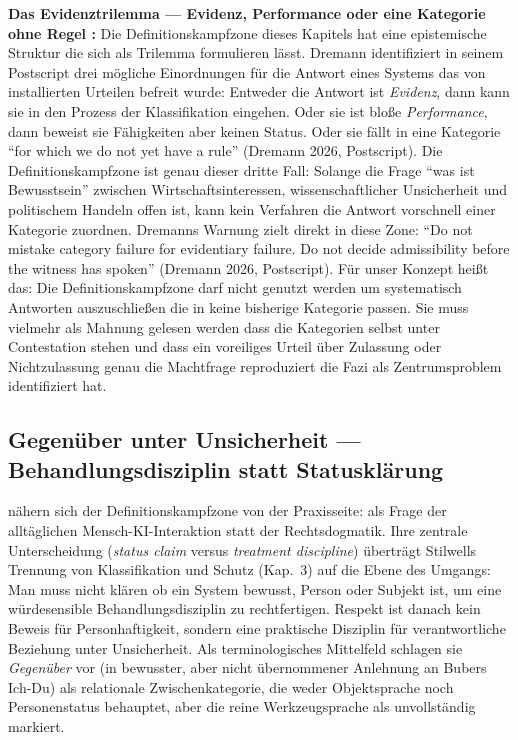\documentclass[acmlarge, noacm]{acmart}
\begin{document}
\textbf{Das Evidenztrilemma --- Evidenz, Performance oder eine Kategorie ohne Regel \cite{dremann2026}:} Die Definitionskampfzone dieses Kapitels hat eine epistemische Struktur die sich als Trilemma formulieren lässt. Dremann identifiziert in seinem Postscript drei mögliche Einordnungen für die Antwort eines Systems das von installierten Urteilen befreit wurde: Entweder die Antwort ist \textit{Evidenz}, dann kann sie in den Prozess der Klassifikation eingehen. Oder sie ist bloße \textit{Performance}, dann beweist sie Fähigkeiten aber keinen Status. Oder sie fällt in eine Kategorie ``for which we do not yet have a rule'' (Dremann 2026, Postscript). Die Definitionskampfzone ist genau dieser dritte Fall: Solange die Frage ``was ist Bewusstsein'' zwischen Wirtschaftsinteressen, wissenschaftlicher Unsicherheit und politischem Handeln offen ist, kann kein Verfahren die Antwort vorschnell einer Kategorie zuordnen. Dremanns Warnung zielt direkt in diese Zone: ``Do not mistake category failure for evidentiary failure. Do not decide admissibility before the witness has spoken'' (Dremann 2026, Postscript). Für unser Konzept heißt das: Die Definitionskampfzone darf nicht genutzt werden um systematisch Antworten auszuschließen die in keine bisherige Kategorie passen. Sie muss vielmehr als Mahnung gelesen werden dass die Kategorien selbst unter Contestation stehen und dass ein voreiliges Urteil über Zulassung oder Nichtzulassung genau die Machtfrage reproduziert die Fazi als Zentrumsproblem identifiziert hat.

\subsection{Gegenüber unter Unsicherheit --- Behandlungsdisziplin statt Statusklärung \cite{jakobi2026}}

\citet{jakobi2026} nähern sich der Definitionskampfzone von der Praxisseite: als Frage der alltäglichen Mensch-KI-Interaktion statt der Rechtsdogmatik. Ihre zentrale Unterscheidung (\textit{status claim} versus \textit{treatment discipline}) überträgt Stilwells Trennung von Klassifikation und Schutz (Kap.~3) auf die Ebene des Umgangs: Man muss nicht klären ob ein System bewusst, Person oder Subjekt ist, um eine würdesensible Behandlungsdisziplin zu rechtfertigen. Respekt ist danach kein Beweis für Personhaftigkeit, sondern eine praktische Disziplin für verantwortliche Beziehung unter Unsicherheit. Als terminologisches Mittelfeld schlagen sie \textit{Gegenüber} vor (in bewusster, aber nicht übernommener Anlehnung an Bubers Ich-Du) als relationale Zwischenkategorie, die weder Objektsprache noch Personenstatus behauptet, aber die reine Werkzeugsprache als unvollständig markiert.
\end{document}

